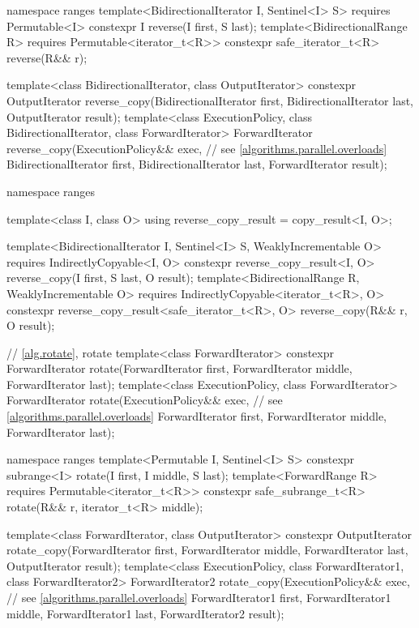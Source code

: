 \begin{codeblock}
{  namespace ranges {
    template<BidirectionalIterator I, Sentinel<I> S>
      requires Permutable<I>
      constexpr I reverse(I first, S last);
    template<BidirectionalRange R>
      requires Permutable<iterator_t<R>>
      constexpr safe_iterator_t<R> reverse(R&& r);
  }

  template<class BidirectionalIterator, class OutputIterator>
    constexpr OutputIterator
      reverse_copy(BidirectionalIterator first, BidirectionalIterator last,
                   OutputIterator result);
  template<class ExecutionPolicy, class BidirectionalIterator, class ForwardIterator>
    ForwardIterator
      reverse_copy(ExecutionPolicy&& exec, // see \ref{algorithms.parallel.overloads}
                   BidirectionalIterator first, BidirectionalIterator last,
                   ForwardIterator result);

  namespace ranges {
    template<class I, class O>
    using reverse_copy_result = copy_result<I, O>;

    template<BidirectionalIterator I, Sentinel<I> S, WeaklyIncrementable O>
      requires IndirectlyCopyable<I, O>
      constexpr reverse_copy_result<I, O>
        reverse_copy(I first, S last, O result);
    template<BidirectionalRange R, WeaklyIncrementable O>
      requires IndirectlyCopyable<iterator_t<R>, O>
      constexpr reverse_copy_result<safe_iterator_t<R>, O>
        reverse_copy(R&& r, O result);
  }

  // \ref{alg.rotate}, rotate
  template<class ForwardIterator>
    constexpr ForwardIterator rotate(ForwardIterator first,
                                     ForwardIterator middle,
                                     ForwardIterator last);
  template<class ExecutionPolicy, class ForwardIterator>
    ForwardIterator rotate(ExecutionPolicy&& exec, // see \ref{algorithms.parallel.overloads}
                           ForwardIterator first,
                           ForwardIterator middle,
                           ForwardIterator last);

  namespace ranges {
    template<Permutable I, Sentinel<I> S>
      constexpr subrange<I> rotate(I first, I middle, S last);
    template<ForwardRange R>
      requires Permutable<iterator_t<R>>
      constexpr safe_subrange_t<R> rotate(R&& r, iterator_t<R> middle);
  }

  template<class ForwardIterator, class OutputIterator>
    constexpr OutputIterator
      rotate_copy(ForwardIterator first, ForwardIterator middle,
                  ForwardIterator last, OutputIterator result);
  template<class ExecutionPolicy, class ForwardIterator1, class ForwardIterator2>
    ForwardIterator2
      rotate_copy(ExecutionPolicy&& exec, // see \ref{algorithms.parallel.overloads}
                  ForwardIterator1 first, ForwardIterator1 middle,
                  ForwardIterator1 last, ForwardIterator2 result);

}
\end{codeblock}
